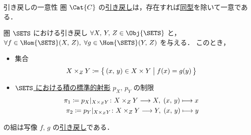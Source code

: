 \documentclass[geometry_main]{subfiles}
\begin{document}
\begin{myprop}[]{引き戻しの一意性}
	圏 $\Cat{C}$ の\hyperref[def:pullback]{引き戻し}は，存在すれば\hyperref[def:iso]{同型}を除いて一意である．
\end{myprop}

\begin{myprop}[label=prop:pullback-sets]{圏 $\SETS$ における引き戻し}
	$\forall X,\, Y,\, Z \in \Obj{\SETS}$ と，$\forall f \in \Hom{\SETS}(X,\, Z),\; \forall g \in \Hom{\SETS}(Y,\, Z)$ を与える．
	このとき，
	\begin{itemize}
		\item 集合
		\begin{align}
			X \times_Z Y \coloneqq \bigl\{\, (x,\, y) \in X \times Y \bigm| f(x) = g(y)  \,\bigr\} 
		\end{align}
		\item \hyperref[prop:product-sets]{$\SETS$ における積の標準的射影} $p_X,\, p_Y$ の制限
		\begin{align}
			\pi_1 \coloneqq p_X|_{X \times_Z Y} \colon X \times_Z Y \longrightarrow X,\; (x,\, y) \longmapsto x \\
			\pi_2 \coloneqq p_Y|_{X \times_Z Y} \colon X \times_Z Y \longrightarrow Y,\; (x,\, y) \longmapsto y
		\end{align}
	\end{itemize}
	の組は写像 $f,\, g$ の\hyperref[def:pullback]{引き戻し}である．
\end{myprop}
\end{document}

